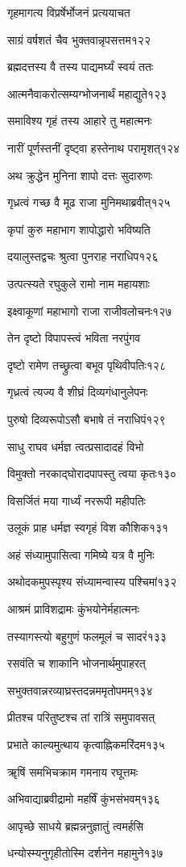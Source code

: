 गृहमागत्य विप्रर्षेर्भोजनं प्रत्ययाचत

साग्रं वर्षशतं चैव भुक्तवान्नृपसत्तम१२२

ब्रह्मदत्तस्य वै तस्य पाद्यमर्घ्यं स्वयं ततः

आत्मनैवाकरोत्सम्यग्भोजनार्थं महाद्युते१२३

समाविश्य गृहं तस्य आहारे तु महात्मनः

नारीं पूर्णस्तनीं दृष्ट्वा हस्तेनाथ परामृशत्१२४

अथ क्रुद्धेन मुनिना शापो दत्तः सुदारुणः

गृध्रत्वं गच्छ वै मूढ राजा मुनिमथाब्रवीत्१२५

कृपां कुरु महाभाग शापोद्धारो भविष्यति

दयालुस्तद्वचः श्रुत्वा पुनराह नराधिप१२६

उत्पत्स्यते रघुकुले रामो नाम महायशाः

इक्ष्वाकूणां महाभागो राजा राजीवलोचनः१२७

तेन दृष्टो विपापस्त्वं भविता नरपुंगव

दृष्टो रामेण तच्छ्रुत्वा बभूव पृथिवीपतिः१२८

गृध्रत्वं त्यज्य वै शीघ्रं दिव्यगंधानुलेपनः

पुरुषो दिव्यरूपोऽसौ बभाषे तं नराधिपं१२९

साधु राघव धर्मज्ञ त्वत्प्रसादादहं विभो

विमुक्तो नरकाद्घोरादपापस्तु त्वया कृतः१३०

विसर्जितं मया गार्ध्यं नररूपी महीपतिः

उलूकं प्राह धर्मज्ञ स्वगृहं विश कौशिक१३१

अहं संध्यामुपासित्वा गमिष्ये यत्र वै मुनिः

अथोदकमुपस्पृश्य संध्यामन्वास्य पश्चिमां१३२

आश्रमं प्राविशद्रामः कुंभयोनेर्महात्मनः

तस्यागस्त्यो बहुगुणं फलमूलं च सादरं१३३

रसवंति च शाकानि भोजनार्थमुपाहरत्

सभुक्तवान्नरव्याघ्रस्तदन्नममृतोपमम्१३४

प्रीतश्च परितुष्टश्च तां रात्रिं समुपावसत्

प्रभाते काल्यमुत्थाय कृत्वाह्निकमरिंदम१३५

ॠषिं समभिचक्राम गमनाय रघूत्तमः

अभिवाद्याब्रवीद्रामो महर्षिं कुंभसंभवम्१३६

आपृच्छे साधये ब्रह्मन्ननुज्ञातुं त्वमर्हसि

धन्योस्म्यनुगृहीतोस्मि दर्शनेन महामुने१३७

